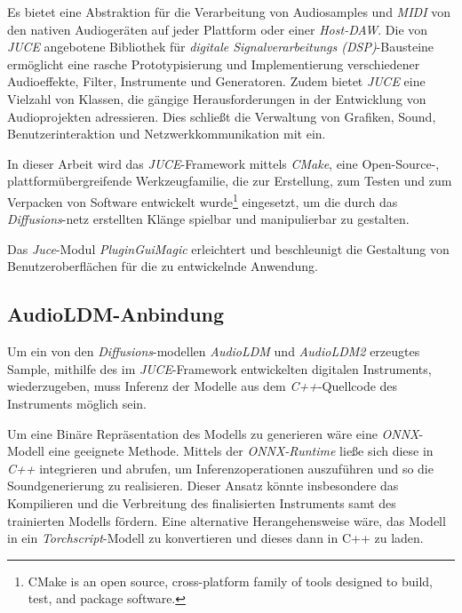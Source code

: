 \documentclass[
  a4paper,  %
  twoside,  %
  bibliography=totoc,
  headsepline,
  cleardoublepage=empty,
  parskip=half,
  draft=false
]{scrbook}
\begin{document}
Es bietet eine Abstraktion für die Verarbeitung von Audiosamples und \emph{MIDI} von den nativen Audiogeräten auf jeder Plattform oder einer \emph{Host-DAW}. Die von \emph{JUCE} angebotene Bibliothek für \emph{digitale Signalverarbeitungs (DSP)}-Bausteine ermöglicht eine rasche Prototypisierung und Implementierung verschiedener Audioeffekte, Filter, Instrumente und Generatoren. \cite{noauthor_juce_nodate} Zudem bietet \emph{JUCE} eine Vielzahl von Klassen, die gängige Herausforderungen in der Entwicklung von Audioprojekten adressieren. Dies schließt die Verwaltung von Grafiken, Sound, Benutzerinteraktion und Netzwerkkommunikation mit ein. \cite{robinson_getting_2013}

In dieser Arbeit wird das \emph{JUCE}-Framework mittels \emph{CMake}, \glqq eine Open-Source-, plattformübergreifende Werkzeugfamilie, die zur Erstellung, zum Testen und zum Verpacken von Software entwickelt wurde\grqq \footnote{CMake is an open source, cross-platform family of tools designed to build, test, and package software.} \cite{noauthor_cmake_nodate} eingesetzt, um die durch das \emph{Diffusions}-netz erstellten Klänge spielbar und manipulierbar zu gestalten. 

Das \emph{Juce}-Modul \emph{PluginGuiMagic} \cite{walz_plugin_nodate} erleichtert und beschleunigt die Gestaltung von Benutzeroberflächen für die zu entwickelnde Anwendung.

\subsection{AudioLDM-Anbindung} \label{sec:api}
Um ein von den \emph{Diffusions}-modellen \emph{AudioLDM} und \emph{AudioLDM2} erzeugtes Sample, mithilfe des im \emph{JUCE}-Framework entwickelten digitalen Instruments, wiederzugeben, muss Inferenz der Modelle aus dem \emph{C++}-Quellcode des Instruments möglich sein.

Um eine Binäre Repräsentation des Modells zu generieren wäre eine \emph{ONNX}-Modell \cite{noauthor_onnx_nodate} eine geeignete Methode. Mittels der \emph{ONNX-Runtime} \cite{noauthor_onnx-runtime_nodate} ließe sich diese in \emph{C++} integrieren und abrufen, um Inferenzoperationen auszuführen und so die Soundgenerierung zu realisieren. Dieser Ansatz könnte insbesondere das Kompilieren und die Verbreitung des finalisierten Instruments samt des trainierten Modells fördern. Eine alternative Herangehensweise wäre, das Modell in ein \emph{Torchscript}-Modell \cite{noauthor_torchscript_nodate} zu konvertieren und dieses dann in C++ zu laden. \cite{oli_larkin_machine_2023}
\end{document}
